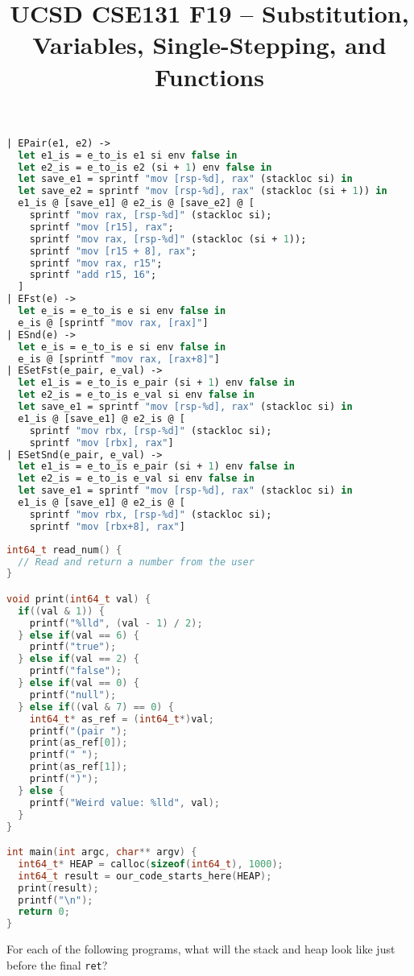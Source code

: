 \documentclass[10pt, oneside]{article}
\title{UCSD CSE131 F19 -- Substitution, Variables, Single-Stepping, and Functions}
\begin{document}
\begin{minipage}{.6\textwidth}
\begin{lstlisting}[language=ml]
| EPair(e1, e2) ->
  let e1_is = e_to_is e1 si env false in
  let e2_is = e_to_is e2 (si + 1) env false in
  let save_e1 = sprintf "mov [rsp-%d], rax" (stackloc si) in
  let save_e2 = sprintf "mov [rsp-%d], rax" (stackloc (si + 1)) in
  e1_is @ [save_e1] @ e2_is @ [save_e2] @ [
    sprintf "mov rax, [rsp-%d]" (stackloc si);
    sprintf "mov [r15], rax";
    sprintf "mov rax, [rsp-%d]" (stackloc (si + 1));
    sprintf "mov [r15 + 8], rax";
    sprintf "mov rax, r15";
    sprintf "add r15, 16";
  ]
| EFst(e) ->
  let e_is = e_to_is e si env false in
  e_is @ [sprintf "mov rax, [rax]"]
| ESnd(e) ->
  let e_is = e_to_is e si env false in
  e_is @ [sprintf "mov rax, [rax+8]"]
| ESetFst(e_pair, e_val) ->
  let e1_is = e_to_is e_pair (si + 1) env false in
  let e2_is = e_to_is e_val si env false in
  let save_e1 = sprintf "mov [rsp-%d], rax" (stackloc si) in
  e1_is @ [save_e1] @ e2_is @ [
    sprintf "mov rbx, [rsp-%d]" (stackloc si);
    sprintf "mov [rbx], rax"]
| ESetSnd(e_pair, e_val) ->
  let e1_is = e_to_is e_pair (si + 1) env false in
  let e2_is = e_to_is e_val si env false in
  let save_e1 = sprintf "mov [rsp-%d], rax" (stackloc si) in
  e1_is @ [save_e1] @ e2_is @ [
    sprintf "mov rbx, [rsp-%d]" (stackloc si);
    sprintf "mov [rbx+8], rax"]
\end{lstlisting}
\end{minipage}
\begin{minipage}{.4\textwidth}
\begin{lstlisting}[language=c]
int64_t read_num() {
  // Read and return a number from the user
}

void print(int64_t val) {
  if((val & 1)) {
    printf("%lld", (val - 1) / 2);
  } else if(val == 6) {
    printf("true");
  } else if(val == 2) {
    printf("false");
  } else if(val == 0) {
    printf("null");
  } else if((val & 7) == 0) {
    int64_t* as_ref = (int64_t*)val;
    printf("(pair ");
    print(as_ref[0]);
    printf(" ");
    print(as_ref[1]);
    printf(")");
  } else {
    printf("Weird value: %lld", val);
  }
}

int main(int argc, char** argv) {
  int64_t* HEAP = calloc(sizeof(int64_t), 1000);
  int64_t result = our_code_starts_here(HEAP);
  print(result);
  printf("\n");
  return 0;
}
\end{lstlisting}
\end{minipage}

For each of the following programs, what will the stack and heap look like
just before the final {\tt ret}?
\end{document}
